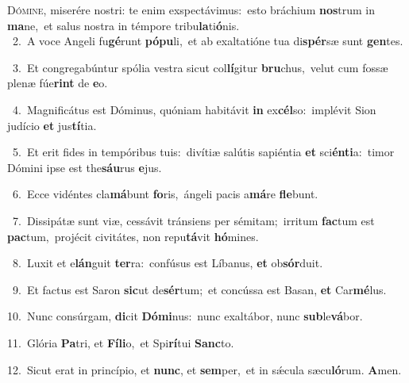 \lettrine{\initial\textcolor{\initialcolor}{D}}{ómine,} miserére nostri: te enim exspectávimus:~\dagger esto bráchium \textbf{nos}\-trum in \textbf{ma}\-ne,~\star et salus nostra in témpore tribu\-\textbf{la}\-ti\-\textbf{ó}\-nis.\\
{\numbfont\textcolor{\numbcolor}{~2.}}~A voce Angeli fu\-\textbf{gé}\-runt \textbf{pó}\-\textbf{pu}li,~\star et ab exaltatióne tua di\-\textbf{spér}\-sæ sunt \textbf{gen}\-tes.\par
{\numbfont\textcolor{\numbcolor}{~3.}}~Et congregabúntur spólia vestra sicut col\-\textbf{lí}\-gitur \textbf{bru}\-chus,~\star velut cum fossæ plenæ fúe\textbf{rint} de \textbf{e}\-o.\par
{\numbfont\textcolor{\numbcolor}{~4.}}~Magnificátus est Dóminus, quóniam habitávit \textbf{in} ex\-\textbf{cél}\-so:~\star implévit Sion judício \textbf{et} jus\-\textbf{tí}\-tia.\par
{\numbfont\textcolor{\numbcolor}{~5.}}~Et erit fides in tempóribus tuis:~\dagger divítiæ salútis sapiéntia \textbf{et} sci\-\textbf{én}\-\textbf{ti}a:~\star timor Dómini ipse est the\-\textbf{sáu}\-rus \textbf{e}\-jus.\par
{\numbfont\textcolor{\numbcolor}{~6.}}~Ecce vidéntes cla\-\textbf{má}\-bunt \textbf{fo}\-ris,~\star ángeli pacis a\-\textbf{má}\-re \textbf{fle}\-bunt.\par
{\numbfont\textcolor{\numbcolor}{~7.}}~Dissipátæ sunt viæ, cessávit tránsiens per sémitam;~\dagger irritum \textbf{fac}\-tum est \textbf{pac}\-tum,~\star projécit civitátes, non repu\-\textbf{tá}\-vit \textbf{hó}\-mines.\par
{\numbfont\textcolor{\numbcolor}{~8.}}~Luxit et e\-\textbf{lán}\-guit \textbf{ter}\-ra:~\star confúsus est Líbanus, \textbf{et} ob\-\textbf{sór}\-duit.\par
{\numbfont\textcolor{\numbcolor}{~9.}}~Et factus est Saron \textbf{sic}\-ut de\-\textbf{sér}\-tum;~\star et concússa est Basan, \textbf{et} Car\-\textbf{mé}\-lus.\par
{\numbfont\textcolor{\numbcolor}{10.}}~Nunc consúrgam, \textbf{di}\-cit \textbf{Dó}\-\textbf{mi}nus:~\star nunc exaltábor, nunc \textbf{sub}\-le\-\textbf{vá}\-bor.\par
{\numbfont\textcolor{\numbcolor}{11.}}~Glória \textbf{Pa}\-tri, et \textbf{Fí}\-\textbf{li}o,~\star et Spi\-\textbf{rí}\-tui \textbf{Sanc}\-to.\par
{\numbfont\textcolor{\numbcolor}{12.}}~Sicut erat in princípio, et \textbf{nunc}\-, et \textbf{sem}\-per,~\star et in sǽcula sæcu\-\textbf{ló}\-rum. \textbf{A}\-men.\par
